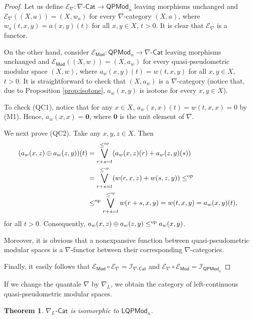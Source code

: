 \documentclass[11pt,a4paper]{amsart}
\newtheorem{theorem}{Theorem}[section]
\theoremstyle{definition}
\begin{document}
	\begin{proof}
		Let us define $\mathscr{E}_\nabla:\nabla\text{-}\mathsf{Cat}\to \mathsf{QPMod}_n$ leaving morphisms unchanged and $\mathscr{E}_\nabla ((X,a))=(X,w_a)$ for every $\nabla$-category $(X,a)$, where $w_a(t,x,y)=a(x,y)(t)$ for all $x,y\in X$, $t>0.$ It is clear that $\mathscr{E}_\nabla$ is a functor.
		
		On the other hand, consider $\mathscr{E}_{\mathsf{Mod}}:\mathsf{QPMod}_n\to\nabla\text{-}\mathsf{Cat}$ leaving morphisms unchanged and $\mathscr{E}_{\mathsf{Mod}} ((X,w))=(X,a_w)$ for every quasi-pseudometric modular space $(X,w)$, where $a_w(x,y)(t)=w(t,x,y)$ for all $x,y\in X$, $t>0.$ It is straightforward to check that $(X,a_w)$ is a $\nabla$-category (notice that, due to Proposition \ref{prop:isotone}, $a_w(x,y)$ is isotone for every $x,y\in X$).
		
		To check (QC1), notice that for any $x\in X$, $a_w(x,x)(t)=w(t,x,x)=0$ by  (M1). Hence, $a_w(x,x)=\mathbf{0}$, where $\mathbf{0}$ is the unit element of $\nabla$.
		
		We next prove (QC2). Take any $x,y,z\in X$. Then
		\begin{align*}
			(a_w(x,z)\oplus a_w(z,y))(t)&=\bigvee_{r+s=t}^{\leq^\text{\normalfont op}}(a_w(x,z)(r)+a_w(z,y)(s))\\&=\bigvee_{r+s=t}^{\leq^\text{\normalfont op}}(w(r,x,z)+w(s,z,y))\leq^\text{\normalfont op}\\&\leq^\text{\normalfont op}\bigvee_{r+s=t}^{\leq^\text{\normalfont op}}w(r+s,x,y)=w(t,x,y)=a_w(x,y)(t),
		\end{align*}
		for all $t>0.$
		Consequently, $a_w(x,z)\oplus a_w(z,y)\leq^\text{\normalfont op} a_w(x,y)$.
		
		Moreover, it is obvious that a nonexpansive function between quasi-pseudometric modular spaces is a $\nabla$-functor between their corresponding $\nabla$-categories.
		
		Finally, it easily follows that $\mathscr{E}_{\mathsf{Mod}}\circ \mathscr{E}_\nabla=\mathscr{I}_{\nabla\text{-}\mathsf{Cat}}$ and $ \mathscr{E}_\nabla\circ \mathscr{E}_{\mathsf{Mod}}=\mathscr{I}_{\mathsf{QPMod}_n}$
	\end{proof}
	
	
	If we change the quantale $\nabla$ by $\nabla_L$, we obtain the category of left-continuous quasi-pseudometric modular spaces.
	
	\begin{theorem}\label{prop: modular LQcategory}
		$\nabla_L$-$\mathsf{Cat}$ is isomorphic to  $\mathsf{LQPMod}_n$.
	\end{theorem}
	
\end{document}
